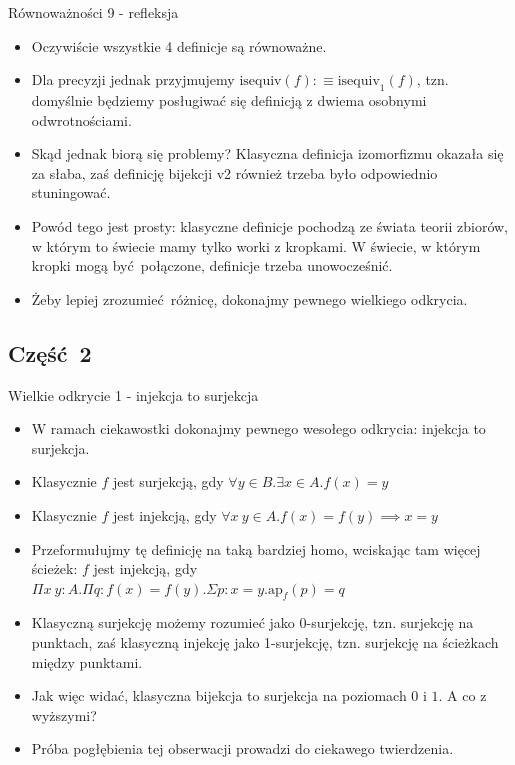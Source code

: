 \documentclass{beamer}
\newcommand{\defn}{:\equiv}
\newcommand{\ap}[2]{\text{ap}_{#1}(#2)}
\newcommand{\isequiv}{\text{isequiv}}
\begin{document}
\begin{frame}{Równoważności 9 - refleksja}
\begin{itemize}
	\item Oczywiście wszystkie 4 definicje są równoważne.
	\item Dla precyzji jednak przyjmujemy $\isequiv(f) \defn \isequiv_1(f)$, tzn. domyślnie będziemy posługiwać się definicją z dwiema osobnymi odwrotnościami.
	\item Skąd jednak biorą się problemy? Klasyczna definicja izomorfizmu okazała się za słaba, zaś definicję bijekcji v2 również trzeba było odpowiednio stuningować.
	\item Powód tego jest prosty: klasyczne definicje pochodzą ze świata teorii zbiorów, w którym to świecie mamy tylko worki z kropkami. W świecie, w którym kropki mogą być połączone, definicje trzeba unowocześnić.
	\item Żeby lepiej zrozumieć różnicę, dokonajmy pewnego wielkiego odkrycia.
\end{itemize}
\end{frame}

\subsection{Część 2}

\begin{frame}{Wielkie odkrycie 1 - injekcja to surjekcja}
\begin{itemize}
	\item W ramach ciekawostki dokonajmy pewnego wesołego odkrycia: injekcja to surjekcja.
	\item Klasycznie $f$ jest surjekcją, gdy $\forall y \in B. \exists x \in A. f(x) = y$
	\item Klasycznie $f$ jest injekcją, gdy $\forall x\ y \in A. f(x) = f(y) \implies x = y$
	\item Przeformułujmy tę definicję na taką bardziej homo, wciskając tam więcej ścieżek: $f$ jest injekcją, gdy $\Pi x\ y : A. \Pi q : f(x) = f(y). \Sigma p : x = y. \ap{f}{p} = q$
	\item Klasyczną surjekcję możemy rozumieć jako 0-surjekcję, tzn. surjekcję na punktach, zaś klasyczną injekcję jako 1-surjekcję, tzn. surjekcję na ścieżkach między punktami.
	\item Jak więc widać, klasyczna bijekcja to surjekcja na poziomach $0$ i $1$. A co z wyższymi?
	\item Próba pogłębienia tej obserwacji prowadzi do ciekawego twierdzenia.
\end{itemize}
\end{frame}
\end{document}
